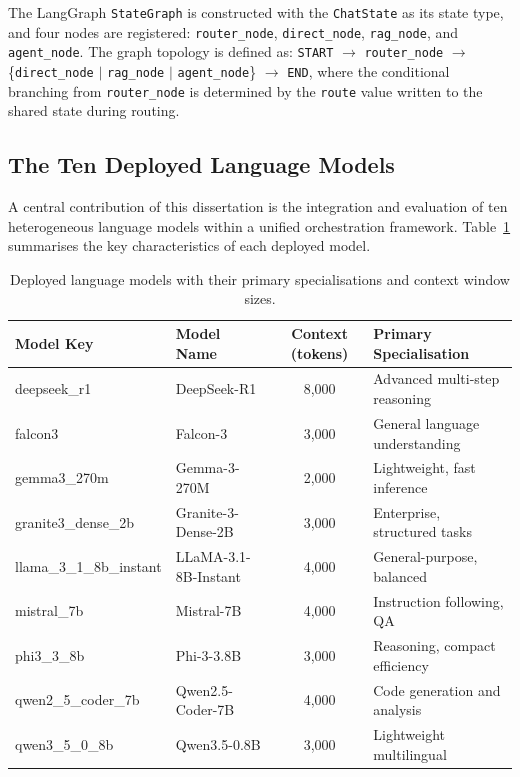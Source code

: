 \documentclass[12pt,a4paper]{article}
\begin{document}
The LangGraph \texttt{StateGraph} is constructed with the \texttt{ChatState} as its state type, and four nodes are registered: \texttt{router\_node}, \texttt{direct\_node}, \texttt{rag\_node}, and \texttt{agent\_node}. The graph topology is defined as: \texttt{START} $\rightarrow$ \texttt{router\_node} $\rightarrow$ \{\texttt{direct\_node} $|$ \texttt{rag\_node} $|$ \texttt{agent\_node}\} $\rightarrow$ \texttt{END}, where the conditional branching from \texttt{router\_node} is determined by the \texttt{route} value written to the shared state during routing.

\subsection{The Ten Deployed Language Models}
\label{subsec:models}

A central contribution of this dissertation is the integration and evaluation of ten heterogeneous language models within a unified orchestration framework. Table~\ref{tab:models} summarises the key characteristics of each deployed model.

\begin{table}[htbp]
\centering
\caption{Deployed language models with their primary specialisations and context window sizes.}
\label{tab:models}
\begin{tabular}{|l|l|c|p{3.5cm}|}
\hline
\textbf{Model Key} & \textbf{Model Name} & \textbf{Context (tokens)} & \textbf{Primary Specialisation} \\
\hline
deepseek\_r1 & DeepSeek-R1 & 8,000 & Advanced multi-step reasoning \\
\hline
falcon3 & Falcon-3 & 3,000 & General language understanding \\
\hline
gemma3\_270m & Gemma-3-270M & 2,000 & Lightweight, fast inference \\
\hline
granite3\_dense\_2b & Granite-3-Dense-2B & 3,000 & Enterprise, structured tasks \\
\hline
llama\_3\_1\_8b\_instant & LLaMA-3.1-8B-Instant & 4,000 & General-purpose, balanced \\
\hline
mistral\_7b & Mistral-7B & 4,000 & Instruction following, QA \\
\hline
phi3\_3\_8b & Phi-3-3.8B & 3,000 & Reasoning, compact efficiency \\
\hline
qwen2\_5\_coder\_7b & Qwen2.5-Coder-7B & 4,000 & Code generation and analysis \\
\hline
qwen3\_5\_0\_8b & Qwen3.5-0.8B & 3,000 & Lightweight multilingual \\
\hline
\end{tabular}
\end{table}
\end{document}
